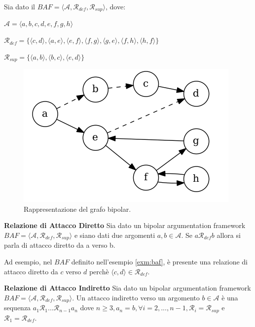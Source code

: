 \bigskip
\begin{exmp}
    Sia dato il $BAF  = ⟨\mathcal{A}, \mathcal{R}_{def}, \mathcal{R}_{sup}⟩$, dove:
    \begin{center}
        $\mathcal{A} = ⟨a, b, c, d, e, f, g, h⟩$
        
        $\mathcal{R}_{def} = \{⟨c, d⟩, ⟨a, e⟩, ⟨e, f⟩, ⟨f, g⟩, ⟨g, e⟩, ⟨f, h⟩, ⟨h, f⟩\}$
        
        $\mathcal{R}_{sup} = \{⟨a, b⟩, ⟨b, c⟩, ⟨e, d⟩\}$
    \end{center}
    
    \begin{figure}
      \includegraphics[width=\linewidth]{Immagini/example-baf-graph.png}
      \caption{Rappresentazione del grafo bipolar.}
      \label{fig:baf-graph1}
    \end{figure}
    
    \label{exm:baf}
\end{exmp}

\bigskip
\begin{defn} \textbf{Relazione di Attacco Diretto} 
Sia dato un bipolar argumentation framework $BAF = ⟨\mathcal{A}, \mathcal{R}_{def}, \mathcal{R}_{sup}⟩$ e siano dati due argomenti $a, b ∈ \mathcal{A}$. Se $ a \mathcal{R}_{def} b$ allora si parla di attacco diretto da a verso b.
\end{defn}

Ad esempio, nel $BAF$ definito nell'esempio \ref{exm:baf}, è presente una relazione di attacco diretto da $c$ verso $d$ perchè $⟨c, d⟩ ∈ \mathcal{R}_{def}$.


\bigskip
\begin{defn} \textbf{Relazione di Attacco Indiretto} 
Sia dato un bipolar argumentation framework $BAF = ⟨\mathcal{A}, \mathcal{R}_{def}, \mathcal{R}_{sup}⟩$. Un attacco indiretto verso un argomento $b ∈ \mathcal{A}$ è una sequenza $a_{1}\mathcal{R}_{1}...\mathcal{R}_{n-1}a_{n}$ dove $n \geq 3, a_n = b, \forall i = 2, ..., n-1, \mathcal{R}_i = \mathcal{R}_{sup}$ e $ \mathcal{R}_{1} = \mathcal{R}_{def}$.
\end{defn}

